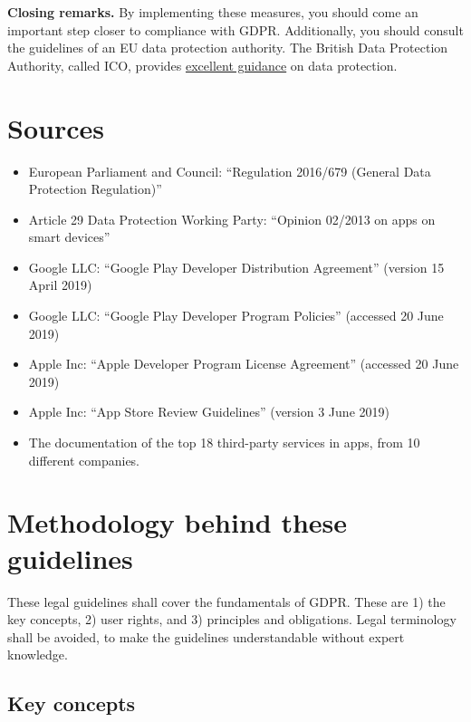 \documentclass[
]{book}
\providecommand{\tightlist}{%
  \setlength{\itemsep}{0pt}\setlength{\parskip}{0pt}}
\begin{document}
\textbf{Closing remarks.} By implementing these measures, you should come an important step closer to compliance with GDPR. Additionally, you should consult the guidelines of an EU data protection authority. The British Data Protection Authority, called ICO, provides \href{https://ico.org.uk/for-organisations/}{excellent guidance} on data protection.

\hypertarget{sources}{%
\section{Sources}\label{sources}}

\begin{itemize}
\tightlist
\item
  European Parliament and Council: ``Regulation 2016/679 (General Data Protection Regulation)''
\item
  Article 29 Data Protection Working Party: ``Opinion 02/2013 on apps on smart devices''
\item
  Google LLC: ``Google Play Developer Distribution Agreement'' (version 15 April 2019)
\item
  Google LLC: ``Google Play Developer Program Policies'' (accessed 20 June 2019)
\item
  Apple Inc: ``Apple Developer Program License Agreement'' (accessed 20 June 2019)
\item
  Apple Inc: ``App Store Review Guidelines'' (version 3 June 2019)
\item
  The documentation of the top 18 third-party services in apps, from 10 different companies.
\end{itemize}

\hypertarget{methodology-behind-these-guidelines}{%
\section{Methodology behind these guidelines}\label{methodology-behind-these-guidelines}}

These legal guidelines shall cover the fundamentals of GDPR. These are 1) the key concepts, 2) user rights, and 3) principles and obligations. Legal terminology shall be avoided, to make the guidelines understandable without expert knowledge.

\hypertarget{key-concepts}{%
\subsection{Key concepts}\label{key-concepts}}
\end{document}

